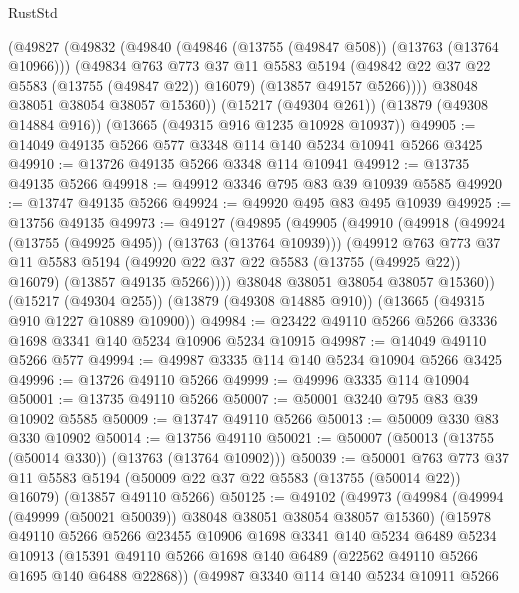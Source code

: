 \begin{lexlean}{RustStd}
\begin{coremodule}
      (@49827
        (@49832
          (@49840
            (@49846 (@13755 (@49847 @508)) (@13763 (@13764 @10966)))
            (@49834
              @763
              @773
              @37
              @11
              @5583
              @5194
              (@49842 @22 @37 @22 @5583 (@13755 (@49847 @22)) @16079)
              (@13857 @49157 @5266))))
        @38048
        @38051
        @38054
        @38057
        @15360))
    (@15217 (@49304 @261))
    (@13879 (@49308 @14884 @916))
    (@13665 (@49315 @916 @1235 @10928 @10937))
@49905 := @14049 @49135 @5266 @577 @3348 @114 @140 @5234 @10941 @5266 @3425
@49910 := @13726 @49135 @5266 @3348 @114 @10941
@49912 := @13735 @49135 @5266
@49918 := @49912 @3346 @795 @83 @39 @10939 @5585
@49920 := @13747 @49135 @5266
@49924 := @49920 @495 @83 @495 @10939
@49925 := @13756 @49135
@49973 := @49127
    (@49895
      (@49905
        (@49910
          (@49918
            (@49924 (@13755 (@49925 @495)) (@13763 (@13764 @10939)))
            (@49912
              @763
              @773
              @37
              @11
              @5583
              @5194
              (@49920 @22 @37 @22 @5583 (@13755 (@49925 @22)) @16079)
              (@13857 @49135 @5266))))
        @38048
        @38051
        @38054
        @38057
        @15360))
    (@15217 (@49304 @255))
    (@13879 (@49308 @14885 @910))
    (@13665 (@49315 @910 @1227 @10889 @10900))
@49984 := @23422 @49110 @5266 @5266 @3336 @1698 @3341 @140 @5234 @10906 @5234 @10915
@49987 := @14049 @49110 @5266 @577
@49994 := @49987 @3335 @114 @140 @5234 @10904 @5266 @3425
@49996 := @13726 @49110 @5266
@49999 := @49996 @3335 @114 @10904
@50001 := @13735 @49110 @5266
@50007 := @50001 @3240 @795 @83 @39 @10902 @5585
@50009 := @13747 @49110 @5266
@50013 := @50009 @330 @83 @330 @10902
@50014 := @13756 @49110
@50021 := @50007 (@50013 (@13755 (@50014 @330)) (@13763 (@13764 @10902)))
@50039 := @50001
    @763
    @773
    @37
    @11
    @5583
    @5194
    (@50009 @22 @37 @22 @5583 (@13755 (@50014 @22)) @16079)
    (@13857 @49110 @5266)
@50125 := @49102
    (@49973
      (@49984
        (@49994 (@49999 (@50021 @50039)) @38048 @38051 @38054 @38057 @15360)
        (@15978
          @49110
          @5266
          @5266
          @23455
          @10906
          @1698
          @3341
          @140
          @5234
          @6489
          @5234
          @10913
          (@15391 @49110 @5266 @1698 @140 @6489 (@22562 @49110 @5266 @1695 @140 @6488 @22868))
          (@49987
            @3340
            @114
            @140
            @5234
            @10911
            @5266

\end{coremodule}
\end{lexlean}
